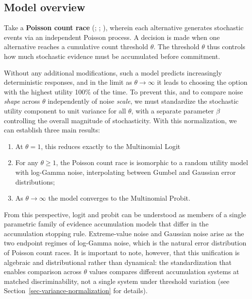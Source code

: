 \documentclass[
  man,
  floatsintext,
  longtable,
  a4paper,
  nolmodern,
  notxfonts,
  notimes,
  colorlinks=true,linkcolor=blue,citecolor=blue,urlcolor=blue]{apa7}
\providecommand{\tightlist}{%
  \setlength{\itemsep}{0pt}\setlength{\parskip}{0pt}}
\begin{document}
\subsection*{Model overview}\label{model-overview}

Take a \textbf{Poisson count race}
(;
; ), wherein each alternative generates stochastic events
via an independent Poisson process. A decision is made when one
alternative reaches a cumulative count threshold \(\theta\). The
threshold \(\theta\) thus controls how much stochastic evidence must be
accumulated before commitment.

Without any additional modifications, such a model predicts increasingly
deterministic responses, and in the limit as \(\theta \to \infty\) it
leads to choosing the option with the highest utility 100\% of the time.
To prevent this, and to compare noise \emph{shape} across \(\theta\)
independently of noise \emph{scale}, we must standardize the stochastic
utility component to unit variance for all \(\theta\), with a separate
parameter \(\beta\) controlling the overall magnitude of stochasticity.
With this normalization, we can establish three main results:

\begin{enumerate}
\def\labelenumi{\arabic{enumi}.}
\tightlist
\item
  At \(\theta = 1\), this reduces exactly to the Multinomial Logit
\item
  For any \(\theta \ge 1\), the Poisson count race is isomorphic to a
  random utility model with log-Gamma noise, interpolating between
  Gumbel and Gaussian error distributions;
\item
  As \(\theta \to \infty\) the model converges to the Multinomial
  Probit.
\end{enumerate}

From this perspective, logit and probit can be understood as members of
a single parametric family of evidence accumulation models that differ
in the accumulation stopping rule. Extreme-value noise and Gaussian
noise arise as the two endpoint regimes of log-Gamma noise, which is the
natural error distribution of Poisson count races. It is important to
note, however, that this unification is algebraic and distributional
rather than dynamical: the standardization that enables comparison
across \(\theta\) values compares different accumulation systems at
matched discriminability, not a single system under threshold variation
(see Section~\ref{sec-variance-normalization} for details).
\end{document}
